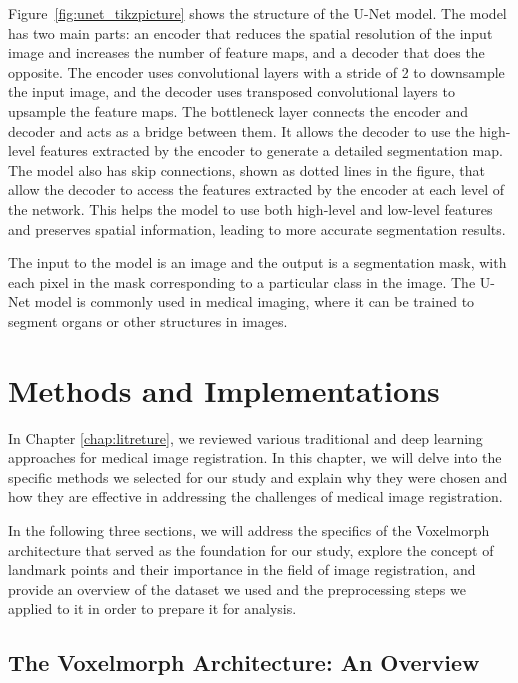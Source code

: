 \documentclass{report}
\begin{document}
	Figure~\ref{fig:unet_tikzpicture} shows the structure of the U-Net model. The model has two main parts: an encoder that reduces the spatial resolution of the input image and increases the number of feature maps, and a decoder that does the opposite. The encoder uses convolutional layers with a stride of 2 to downsample the input image, and the decoder uses transposed convolutional layers to upsample the feature maps. The bottleneck layer connects the encoder and decoder and acts as a bridge between them. It allows the decoder to use the high-level features extracted by the encoder to generate a detailed segmentation map. The model also has skip connections, shown as dotted lines in the figure, that allow the decoder to access the features extracted by the encoder at each level of the network. This helps the model to use both high-level and low-level features and preserves spatial information, leading to more accurate segmentation results.
	
	The input to the model is an image and the output is a segmentation mask, with each pixel in the mask corresponding to a particular class in the image. The U-Net model is commonly used in medical imaging, where it can be trained to segment organs or other structures in images.
	
	\chapter{Methods and Implementations}
	In Chapter \ref{chap:litreture}, we reviewed various traditional and deep learning approaches for medical image registration. In this chapter, we will delve into the specific methods we selected for our study and explain why they were chosen and how they are effective in addressing the challenges of medical image registration.
	
	In the following three sections, we will address the specifics of the Voxelmorph architecture \cite{Balakrishnan_2019} that served as the foundation for our study, explore the concept of landmark points and their importance in the field of image registration, and provide an overview of the dataset we used and the preprocessing steps we applied to it in order to prepare it for analysis.
	
	\section{The Voxelmorph Architecture: An Overview}
	\label{sec:vxm_architecture}
	
\end{document}
